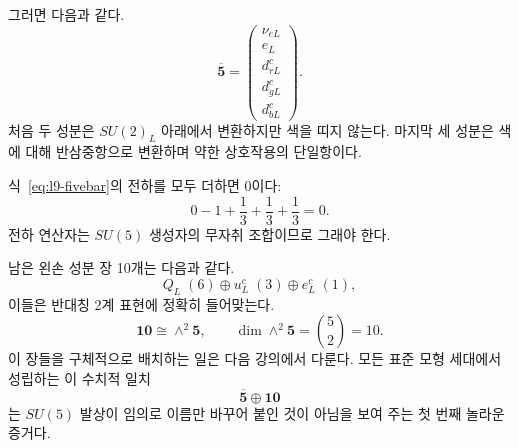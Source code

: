 그러면 다음과 같다.
\begin{equation}
\overline{\mathbf5}
=
\begin{pmatrix}
\nu_{eL}\\
e_L\\
d^c_{rL}\\
d^c_{gL}\\
d^c_{bL}
\end{pmatrix}.
\label{eq:l9-fivebar}
\end{equation}
처음 두 성분은 \(SU(2)_L\) 아래에서 변환하지만 색을 띠지 않는다. 마지막 세 성분은 색에 대해 반삼중항으로 변환하며 약한 상호작용의 단일항이다.

\begin{classroomqa}
\end{classroomqa}

식~\eqref{eq:l9-fivebar}의 전하를 모두 더하면 0이다:
\begin{equation}
0-1+\frac13+\frac13+\frac13=0.
\label{eq:l9-fivebar-charge-sum}
\end{equation}
전하 연산자는 \(SU(5)\) 생성자의 무자취 조합이므로 그래야 한다.

\begin{classroomqa}
\end{classroomqa}

남은 왼손 성분 장 10개는 다음과 같다.
\begin{equation}
Q_L\;(6)
\oplus
u^c_L\;(3)
\oplus
e^c_L\;(1),
\end{equation}
이들은 반대칭 2계 표현에 정확히 들어맞는다.
\begin{equation}
\mathbf{10}\cong\wedge^2\mathbf5,
\qquad
\dim\wedge^2\mathbf5=\binom52=10.
\label{eq:l9-ten-preview}
\end{equation}
이 장들을 구체적으로 배치하는 일은 다음 강의에서 다룬다. 모든 표준 모형 세대에서 성립하는 이 수치적 일치
\begin{equation}
\overline{\mathbf5}\oplus\mathbf{10}
\end{equation}
는 \(SU(5)\) 발상이 임의로 이름만 바꾸어 붙인 것이 아님을 보여 주는 첫 번째 놀라운 증거다.

